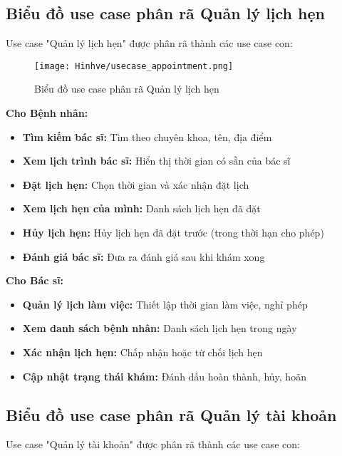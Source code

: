 \documentclass[../DoAn.tex]{subfiles}
\begin{document}
\subsection{Biểu đồ use case phân rã Quản lý lịch hẹn}
\label{subsection:2.2.2}

Use case "Quản lý lịch hẹn" được phân rã thành các use case con:

\begin{figure}[H]
    \centering
    \texttt{[image: Hinhve/usecase\_appointment.png]}
    \caption{Biểu đồ use case phân rã Quản lý lịch hẹn}
    \label{fig:usecase_appointment}
\end{figure}

\textbf{Cho Bệnh nhân:}
\begin{itemize}
    \item \textbf{Tìm kiếm bác sĩ:} Tìm theo chuyên khoa, tên, địa điểm
    \item \textbf{Xem lịch trình bác sĩ:} Hiển thị thời gian có sẵn của bác sĩ
    \item \textbf{Đặt lịch hẹn:} Chọn thời gian và xác nhận đặt lịch
    \item \textbf{Xem lịch hẹn của mình:} Danh sách lịch hẹn đã đặt
    \item \textbf{Hủy lịch hẹn:} Hủy lịch hẹn đã đặt trước (trong thời hạn cho phép)
    \item \textbf{Đánh giá bác sĩ:} Đưa ra đánh giá sau khi khám xong
\end{itemize}

\textbf{Cho Bác sĩ:}
\begin{itemize}
    \item \textbf{Quản lý lịch làm việc:} Thiết lập thời gian làm việc, nghỉ phép
    \item \textbf{Xem danh sách bệnh nhân:} Danh sách lịch hẹn trong ngày
    \item \textbf{Xác nhận lịch hẹn:} Chấp nhận hoặc từ chối lịch hẹn
    \item \textbf{Cập nhật trạng thái khám:} Đánh dấu hoàn thành, hủy, hoãn
\end{itemize}

\subsection{Biểu đồ use case phân rã Quản lý tài khoản}
\label{subsection:2.2.3}

Use case "Quản lý tài khoản" được phân rã thành các use case con:
\end{document}
